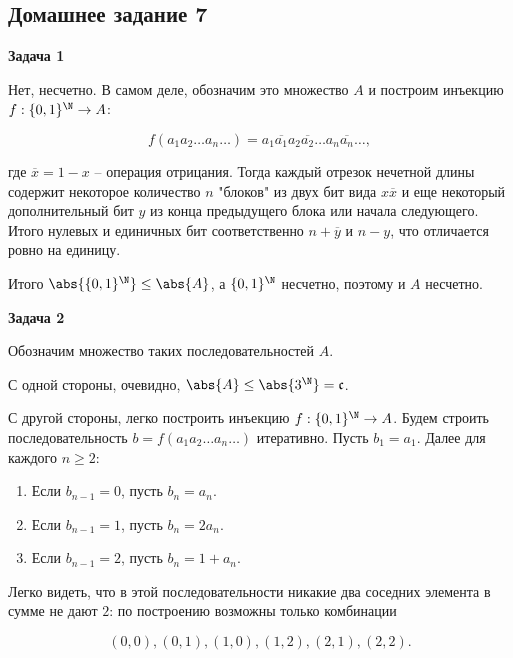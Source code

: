 \subsection{Домашнее задание 7}


	\begin{center}
    \textbf{Задача 1}
\end{center}
		Нет, несчетно. В самом деле, обозначим это множество $A$ и построим инъекцию $f: \{0, 1\}^{\N} \to A$:

		\begin{equation*}
			f(a_1 a_2 \dots a_n \dots) = a_1 \overline{a_1} a_2 \overline{a_2} \dots a_n \overline{a_n} \dots,
		\end{equation*}

		где $\overline{x} = 1 - x$ -- операция отрицания. Тогда каждый отрезок нечетной длины содержит некоторое количество $n$ "блоков" из двух бит вида $x \overline{x}$ и еще некоторый дополнительный бит $y$ из конца предыдущего блока или начала следующего. Итого нулевых и единичных бит соответственно $n + \overline{y}$ и $n - y$, что отличается ровно на единицу.

		Итого $\abs{\{0, 1\}^{\N}} \le \abs{A}$, а $\{0, 1\}^{\N}$ несчетно, поэтому и $A$ несчетно.


	\begin{center}
    \textbf{Задача 2}
\end{center}
		Обозначим множество таких последовательностей $A$.

		С одной стороны, очевидно, $\abs{A} \le \abs{3^{\N}} = \mathfrak{c}$.

		С другой стороны, легко построить инъекцию $f: \{0, 1\}^{\N} \to A$. Будем строить последовательность $b = f(a_1 a_2 \dots a_n \dots)$ итеративно. Пусть $b_1 = a_1$. Далее для каждого $n \ge 2$:

		\begin{enumerate}
			\item Если $b_{n-1} = 0$, пусть $b_n = a_n$.
			\item Если $b_{n-1} = 1$, пусть $b_n = 2 a_n$.
			\item Если $b_{n-1} = 2$, пусть $b_n = 1 + a_n$.
		\end{enumerate}

		Легко видеть, что в этой последовательности никакие два соседних элемента в сумме не дают $2$: по построению возможны только комбинации

		\begin{equation*}
			(0, 0), (0, 1), (1, 0), (1, 2), (2, 1), (2, 2).
		\end{equation*}

